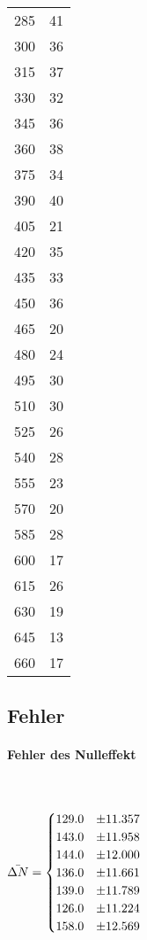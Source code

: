 \begin{table}
\begin{minipage}{.5\linewidth}
\begin{tabular}{c c}
            285	 &  41 \\
            300	 &  36 \\
            315	 &  37 \\
            330	 &  32 \\
            345	 &  36 \\
            360	 &  38 \\
            375	 &  34 \\
            390	 &  40 \\
            405	 &  21 \\
            420	 &  35 \\
            435	 &  33 \\
            450	 &  36 \\
            465	 &  20 \\
            480	 &  24 \\
            495	 &  30 \\
            510	 &  30 \\
            525	 &  26 \\
            540	 &  28 \\
            555	 &  23 \\
            570	 &  20 \\
            585	 &  28 \\
            600	 &  17 \\
            615	 &  26 \\
            630	 &  19 \\
            645	 &  13 \\
            660	 &  17 \\
            \bottomrule
        \end{tabular}
    \end{minipage}
\end{table}
\newpage
\subsection{Fehler}

\paragraph{Fehler des Nulleffekt} \mbox{} \\
\newline 

$\bar{\Delta N} = \begin{cases}
\centering
129.0 & \pm 11.357   \\
143.0 & \pm 11.958    \\
144.0 & \pm 12.000      \\
136.0 & \pm 11.661    \\
139.0 & \pm 11.789   \\
126.0 & \pm 11.224   \\
158.0 & \pm 12.569    
\end{cases}$

